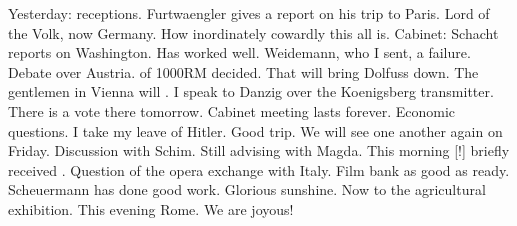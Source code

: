 Yesterday: receptions. Furtwaengler gives a report on his trip to Paris. Lord of the Volk, now  Germany. How inordinately cowardly this all is. 
Cabinet: Schacht reports on Washington. Has worked well. Weidemann, who I sent, a failure. Debate over Austria.  of 1000RM decided. That will bring Dolfuss down.  The gentlemen in Vienna will . I speak to Danzig over the Koenigsberg transmitter. There is a vote there tomorrow. Cabinet meeting lasts forever. Economic questions. I take my leave of Hitler. Good trip. We will see one another again on Friday. Discussion with Schim. Still advising with Magda. This morning [!] briefly received . Question of the opera exchange with Italy. Film bank as good as ready. Scheuermann has done good work. Glorious sunshine. Now to the agricultural exhibition. This evening Rome. We are joyous!

